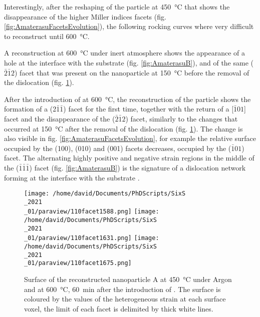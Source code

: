 {%
Interestingly, after the reshaping of the particle at \qty{450}{\degreeCelsius} that shows the disappearance of the higher Miller indices facets (fig. \ref{fig:AmaterasuFacetsEvolution}), the following rocking curves where very difficult to reconstruct until \qty{600}{\degreeCelsius}.

A reconstruction at \qty{600}{\degreeCelsius} under inert atmosphere shows the appearance of a hole at the interface with the substrate (fig. \ref{fig:AmaterasuB}), and of the same ($\bar{2}\bar{1}2$) facet that was present on the nanoparticle at \qty{150}{\degreeCelsius} before the removal of the dislocation (fig. \ref{fig:Amaterasu110}).

After the introduction of  at \qty{600}{\degreeCelsius}, the reconstruction of the particle shows the formation of a (2$\bar{1}\bar{1}$) facet for the first time, together with the return of a [$\bar{1}01$] facet and the disappearance of the ($\bar{2}\bar{1}2$) facet, similarly to the changes that occurred at \qty{150}{\degreeCelsius} after the removal of the dislocation (fig. \ref{fig:Amaterasu110}).
The change is also visible in fig. \ref{fig:AmaterasuFacetsEvolution}, for example the relative surface occupied by the (100), (010) and (001) facets decreases, occupied by the ($\bar{1}01$) facet.
The alternating highly positive and negative strain regions in the middle of the ($\bar{1}\bar{1}\bar{1}$) facet (fig. \ref{fig:AmaterasuB}) is the signature of a dislocation network forming at the interface with the substrate \parencite{Dupraz2015}.

\begin{figure}[!htb]
    \centering
    \texttt{[image: /home/david/Documents/PhDScripts/SixS\\\_2021\\\_01/paraview/110facet1588.png]}
    \texttt{[image: /home/david/Documents/PhDScripts/SixS\\\_2021\\\_01/paraview/110facet1631.png]}
    \texttt{[image: /home/david/Documents/PhDScripts/SixS\\\_2021\\\_01/paraview/110facet1675.png]}
    \caption{
        Surface of the reconstructed nanoparticle A at \qty{450}{\degreeCelsius} under Argon and at \qty{600}{\degreeCelsius}, \qty{60}{\minute} after the introduction of \ammonia.
        The surface is coloured by the values of the heterogeneous strain at each surface voxel, the limit of each facet is delimited by thick white lines.
    }
    \label{fig:Amaterasu110}
\end{figure}

}
